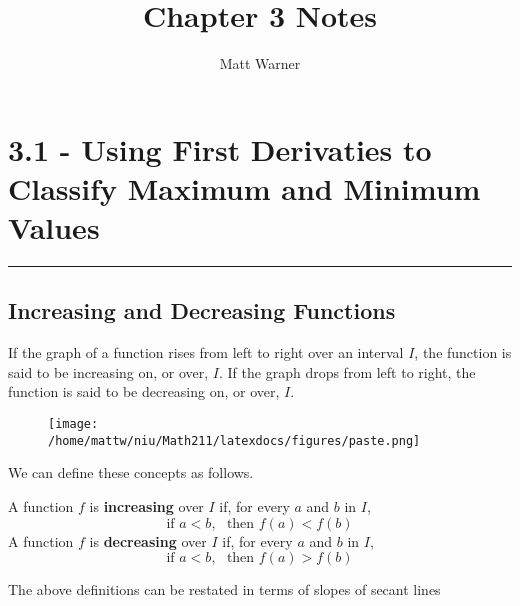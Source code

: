 \documentclass{report}
\title{\Huge{Chapter 3 Notes}}
\author{\huge{Matt Warner}}
\date{\huge{}}
\begin{document}
  \maketitle
  \section*{3.1 - Using First Derivaties to Classify Maximum and Minimum Values}
  \bigbreak \noindent \bigbreak \noindent
  \hrule
  \bigbreak \noindent
  \vspace{-3mm}\subsection*{Increasing and Decreasing Functions}
  \bigbreak \noindent
  If the graph of a function rises from left to right over an interval $I$, the function is said to be increasing on, or over, $I$.
  \bigbreak \noindent
  If the graph drops from left to right, the function is said to be decreasing on, or over, $I$.
  \begin{figure}[ht]
  \centering
  \texttt{[image:   /home/mattw/niu/Math211/latexdocs/figures/paste.png]}
  \end{figure}
\bigbreak \noindent
We can define these concepts as follows.
\begin{mdframed}
  \vspace{2mm}

  A function $f$ is \textbf{increasing} over $I$ if, for every $a$ and $b$ in $I$, 
  $$ \text{if } a < b, \ \ \ \text{then } f(a) < f(b)$$
  A function $f$ is \textbf{decreasing} over $I$ if, for every $a$ and $b$ in $I$,
  $$ \text{if } a < b, \ \ \ \text{then } f(a) > f(b)$$
\end{mdframed}
\bigbreak \noindent
The above definitions can be restated in terms of slopes of secant lines
\end{document}

